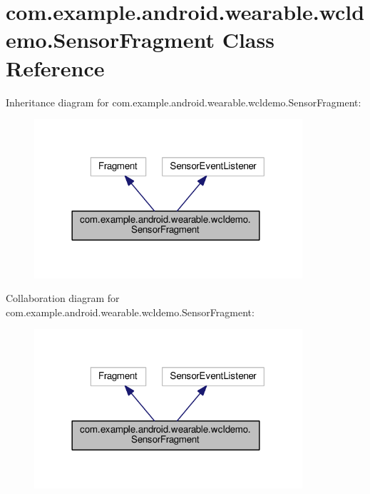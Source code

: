 \hypertarget{classcom_1_1example_1_1android_1_1wearable_1_1wcldemo_1_1SensorFragment}{}\section{com.\+example.\+android.\+wearable.\+wcldemo.\+Sensor\+Fragment Class Reference}
\label{classcom_1_1example_1_1android_1_1wearable_1_1wcldemo_1_1SensorFragment}


Inheritance diagram for com.\+example.\+android.\+wearable.\+wcldemo.\+Sensor\+Fragment\+:
\nopagebreak
\begin{figure}[H]
\begin{center}
\leavevmode
\includegraphics[width=282pt]{db/dad/classcom_1_1example_1_1android_1_1wearable_1_1wcldemo_1_1SensorFragment__inherit__graph}
\end{center}
\end{figure}


Collaboration diagram for com.\+example.\+android.\+wearable.\+wcldemo.\+Sensor\+Fragment\+:
\nopagebreak
\begin{figure}[H]
\begin{center}
\leavevmode
\includegraphics[width=282pt]{dc/d3a/classcom_1_1example_1_1android_1_1wearable_1_1wcldemo_1_1SensorFragment__coll__graph}
\end{center}
\end{figure}

